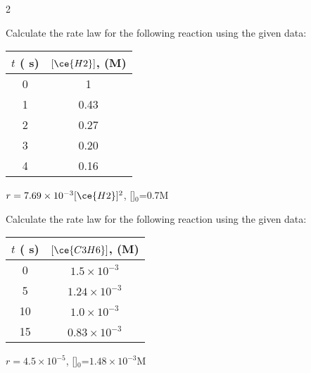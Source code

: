 \documentclass[main.tex]{subfiles}
\begin{document}
\begin{multicols*}{2}
		
\begin{question}[ID=\the\value{numA}]
Calculate the rate law for the following reaction using the given data: 
\begin{center}\begin{tabular}[t]{   c  c   }
\toprule
  $t$ ( s)	&$[\ce{H2}]$, (M) \\
\midrule
		0&	1\\
		1&	0.43	\\
		2&	0.27\\
		3&	0.20\\
		4&	0.16\\
\bottomrule
\end{tabular}\end{center}
\end{question}
\begin{solution}
 $r=7.69\times 10^{-3}[\ce{H2}]^2$, []$_0$=0.7M
\hspace{0.1cm}\end{solution}%
		
			
\begin{question}[ID=\the\value{numA}]
Calculate the rate law for the following reaction using the given data: 
\begin{center}\begin{tabular}[t]{   c  c   }
\toprule
  $t$ ( s)	&$[\ce{C3H6}]$, (M) \\
\midrule
0&$1.5\times10^{-3}$\\
5&$1.24\times10^{-3}$\\
10&$1.0\times10^{-3}$\\
15&$0.83\times10^{-3}$\\
\bottomrule
\end{tabular}\end{center}
\end{question}
\begin{solution}
 $r=4.5\times 10^{-5}$, []$_0$=$1.48\times 10^{-3}$M
\hspace{0.1cm}\end{solution}%
		
			
		

\end{multicols*}
\end{document}
